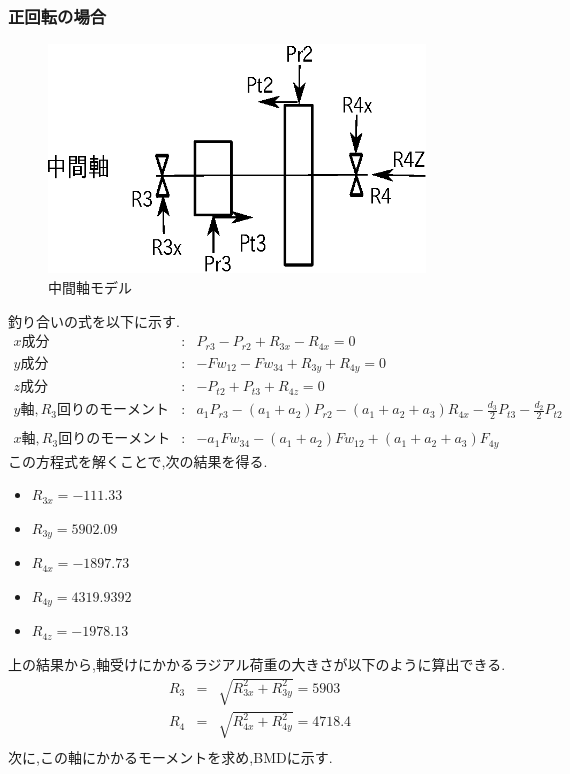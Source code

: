\subsubsection{正回転の場合}
\begin{figure}[htbp]
\begin{center}
\includegraphics[width=10cm]{../picture/jiku4.eps}
\end{center}
\caption{中間軸モデル}
\end{figure}
釣り合いの式を以下に示す.
\begin{eqnarray}
x成分&:&P_{r3}-P_{r2}+R_{3x}-R_{4x}=0\\
y成分&:&-Fw_{12}-Fw_{34}+R_{3y}+R_{4y}=0\\
z成分&:&-P_{t2}+P_{t3}+R_{4z}=0\\
y軸,R_3回りのモーメント&:&a_1P_{r3}-(a_1+a_2)P_{r2}-(a_1+a_2+a_3)R_{4x}-\frac{d_3}{2}P_{t3}-\frac{d_2}{2}P_{t2}\nonumber\\
\\
x軸,R_3回りのモーメント&:&-a_1Fw_{34}-(a_1+a_2)Fw_{12}+(a_1+a_2+a_3)F_{4y}
\end{eqnarray}
この方程式を解くことで,次の結果を得る.
\begin{itemize}
\item $R_{3x} = -111.33$
\item $R_{3y} = 5902.09$
\item $R_{4x} = -1897.73$
\item $R_{4y} = 4319.9392$
\item $R_{4z} = -1978.13$
\end{itemize}
上の結果から,軸受けにかかるラジアル荷重の大きさが以下のように算出できる.
\begin{eqnarray}
R_3 &=& \sqrt {R_{3x}^2+R_{3y}^2} = 5903\\
R_4 &=& \sqrt {R_{4x}^2+R_{4y}^2} = 4718.4\\
\end{eqnarray}
次に,この軸にかかるモーメントを求め,BMDに示す.
